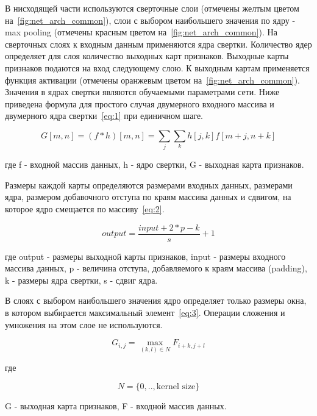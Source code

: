 В нисходящей части используются сверточные слои (отмечены желтым цветом на~\ref{fig:net_arch_common}),
слои с выбором наибольшего значения по ядру - max pooling (отмечены красным цветом на~\ref{fig:net_arch_common}).
На сверточных слоях к входным данным применяются ядра свертки.
Количество ядер определяет для слоя количество выходных карт признаков.
Выходные карты признаков подаются на вход следующему слою.
К выходным картам применяется функция активации (отмечены оранжевым цветом на~\ref{fig:net_arch_common}).
Значения в ядрах свертки являются обучаемыми параметрами сети.
Ниже приведена формула для простого случая двумерного входного массива и двумерного ядра свертки~\eqref{eq:1} при единичном шаге.

\begin{equation}
    \label{eq:1}
    G[m, n] = (f*h)[m, n] = \sum_{j}{\sum_{k}{h[j, k]f[m + j, n + k]}}
\end{equation}

где f - входной массив данных, h - ядро свертки, G - выходная карта признаков.

Размеры каждой карты определяются размерами входных данных, размерами ядра, размером добавочного отступа по краям массива данных и сдвигом,
на которое ядро смещается по массиву~\eqref{eq:2}.

\begin{equation}
    \label{eq:2}
    output = \frac{input + 2 * p - k}{s} + 1
\end{equation}

где output - размеры выходной карты признаков, input - размеры входного массива данных, p - величина отступа, добавляемого к краям массива (padding),
k - размеры ядра свертки, s - сдвиг ядра.

В слоях с выбором наибольшего значения ядро определяет только размеры окна, в котором выбирается максимальный элемент~\eqref{eq:3}.
Операции сложения и умножения на этом слое не используются.

\begin{equation}
    \label{eq:3}
    G_{i, j} = \max_{(k, l) \in N}{F_{i + k, j + l}}
\end{equation}

где

\begin{equation}
    \label{eq:4}
    N = \{0, .. , \text{kernel size}\}
\end{equation}

G - выходная карта признаков, F - входной массив данных.

